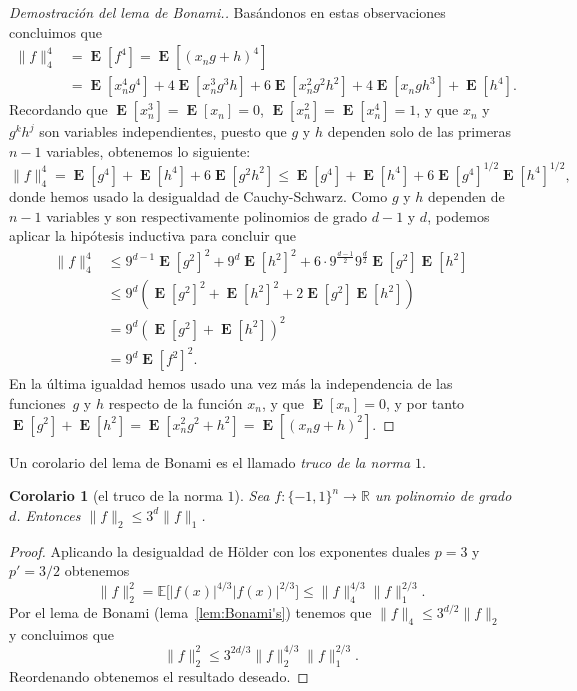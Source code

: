 \documentclass[autocontact]{gaceta}
\newcommand{\R}{\mathbb{R}}
\newtheorem{corollary}{Corolario}
\DeclareMathOperator{\EE}{\mathbf{E}}
\begin{document}
\begin{proof}[Demostración del lema de Bonami.]
Basándonos en estas observaciones concluimos que
\begin{align*}
   \|f\|_4^4 &= \EE[f^4] = \EE[(x_ng+h)^4]
   \\
   &= \EE[x_n^4g^4] + 4 \EE[x_n^3g^3h] + 6 \EE[x_n^2g^2h^2]
   + 4\EE[x_ngh^3] + \EE[h^4].
\end{align*}
Recordando que $\EE[x_n^3]=\EE[x_n]=0$, $\EE[x_n^2]=\EE[x_n^4]=1$, y que $x_n$ y $g^kh^j$ son variables independientes, puesto que $g$ y $h$ dependen solo de las primeras $n-1$ variables, obtenemos lo siguiente:
\[
   \|f\|_4^4 = \EE[g^4] + \EE[h^4] + 6\EE[g^2h^2]
   \leq \EE[g^4] + \EE[h^4] + 6 \EE[g^4]^{1/2} \EE[h^4]^{1/2},
\]
donde hemos usado la desigualdad de Cauchy-Schwarz. Como $g$ y $h$ dependen de $n-1$ variables y son respectivamente polinomios de grado $d-1$ y $d$, podemos aplicar la hipótesis inductiva para concluir que
\begin{align*}
   \|f\|_4^4 &\leq 9^{d-1} \EE[g^2]^2 + 9^{d} \EE[h^2]^2 + 6 \cdot 9^{\frac{d-1}{2}}
   9^{\frac{d}{2}} \EE[g^2] \EE[h^2]
   \\
   &\leq 9^{d} \left( \EE[g^2]^2 + \EE[h^2]^2 + 2 \EE[g^2] \EE[h^2] \right)
   \\
   &= 9^d \left( \EE[g^2] + \EE[h^2] \right)^2
   \\
   &= 9^d \EE[f^2]^2.
\end{align*}
En la última igualdad hemos usado una vez más la independencia de las funciones~$g$ y $h$ respecto de la función $x_n$, y que $\EE[x_n]=0$, y por tanto $\EE[g^2] +\EE[h^2]= \EE[x_n^2g^2+h^2]=\EE[(x_ng+h)^2]$.
\end{proof}

Un corolario del lema de Bonami es el llamado \emph{truco de la norma $1$}.

\begin{corollary}[el truco de la norma $1$]\label{cor:1norm-trick}
Sea $f:\{-1,1\}^n\to \R$ un polinomio de grado $d$. Entonces $\|f\|_2\leq 3^{d}\|f\|_1$.
\end{corollary}

\begin{proof} Aplicando la desigualdad de Hölder con los exponentes duales $p=3$ y $p'=3/2$ obtenemos
\[
\|f\|_2^2 = \mathbb{E}\big[ |f(x)|^{4/3}|f(x)|^{2/3}\big] \leq \|f\|_4^{4/3}\|f\|_1^{2/3}.
\]
Por el lema de Bonami (lema~\ref{lem:Bonami's}) tenemos que $\|f\|_4\leq 3^{d/2}\|f\|_2$ y concluimos que
\[
\|f\|_2^2\leq 3^{2d/3}\|f\|_2^{4/3}\|f\|_1^{2/3}.
\]
Reordenando obtenemos el resultado deseado.
\end{proof}
\end{document}
